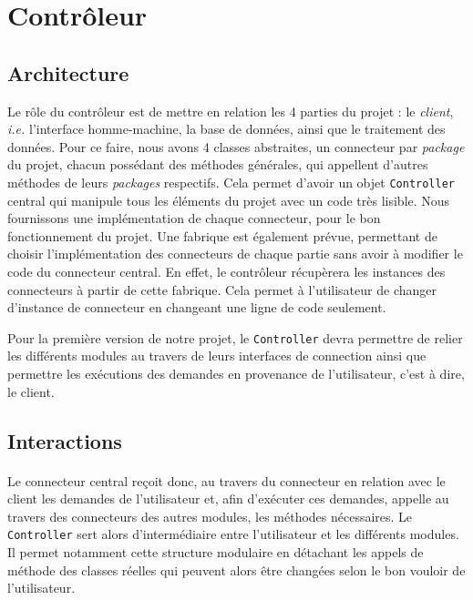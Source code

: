 
\section{Contrôleur}
\subsection{Architecture}

Le rôle du contrôleur est de mettre en relation les 4 parties du projet : le \textit{client}, \textit{i.e.} l'interface homme-machine, la base de données, ainsi que le traitement des données. Pour ce faire, nous avons 4 classes abstraites, un connecteur par \textit{package} du projet, chacun possédant des méthodes générales, qui appellent d'autres méthodes de leurs \textit{packages} respectifs. Cela permet d'avoir un objet \texttt{Controller} central qui manipule tous les éléments du projet avec un code très lisible. Nous fournissons une implémentation de chaque connecteur, pour le bon fonctionnement du projet. Une fabrique est également prévue, permettant de choisir l'implémentation des connecteurs de chaque partie sans avoir à modifier le code du connecteur central. En effet, le contrôleur récupèrera les instances des connecteurs à partir de cette fabrique. Cela permet à l'utilisateur de changer d'instance de connecteur en changeant une ligne de code seulement.

Pour la première version de notre projet, le \texttt{Controller} devra permettre de relier les différents modules au travers de leurs interfaces de connection ainsi que permettre les exécutions des demandes en provenance de l'utilisateur, c'est à dire, le client. 

\subsection{Interactions}
\paragraph{}
Le connecteur central reçoit donc, au travers du connecteur en relation avec le client les demandes de l'utilisateur et, afin d'exécuter ces demandes, appelle au travers des connecteurs des autres modules, les méthodes nécessaires. Le \texttt{Controller} sert alors d'intermédiaire entre l'utilisateur et les différents modules. Il permet notamment cette structure modulaire en détachant les appels de méthode des classes réelles qui peuvent alors être changées selon le bon vouloir de l'utilisateur.
